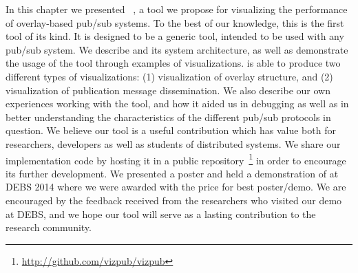 In this chapter we presented \demo{}~\cite{korsveien2014vizpub}, a tool we propose for visualizing
the performance of overlay-based pub/sub systems. To the best of our
knowledge, this is the first tool of its kind. It is designed to be a
generic tool, intended to be used with any pub/sub system. We describe
\demo{} and its system architecture, as well as demonstrate the usage of
the tool through examples of visualizations. \demo{} is able to produce
two different types of visualizations: (1) visualization of overlay
structure, and (2)  visualization of publication message dissemination.
We also describe our own experiences working with the tool, and how it
aided us in debugging as well as in better understanding the
characteristics of the different pub/sub protocols in question. We
believe our tool is a useful contribution which has value both for
researchers, developers as well as students of distributed systems. We
share our implementation code by hosting it in a public
repository~\footnote{\url{http://github.com/vizpub/vizpub}} in order to
encourage its further development. We presented a poster and held a
demonstration of \demo{} at DEBS 2014 where we were awarded with the
price for best poster/demo. We are encouraged by the feedback received
from the researchers who visited our demo at DEBS, and we hope our tool
will serve as a lasting contribution to the research community.

